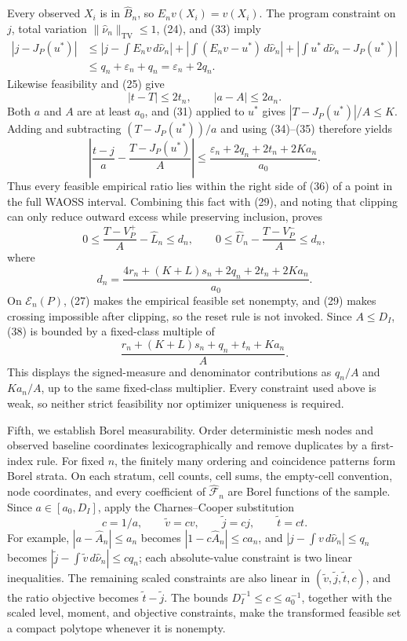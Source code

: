 Every observed \(X_i\) is in \(\widehat B_n\), so \(E_nv(X_i)=v(X_i)\). The program constraint on \(j\), total variation \(\|\widehat\nu_n\|_{\mathrm{TV}}\leq1\), (24), and (33) imply
\[
\begin{aligned}
 |j-J_P(u^*)|
 &\leq\left|j-\int E_nv\,d\widehat\nu_n\right|
 +\left|\int(E_nv-u^*)\,d\widehat\nu_n\right|
 +\left|\int u^*\,d\widehat\nu_n-J_P(u^*)\right|\\
 &\leq q_n+\varepsilon_n+q_n
 =\varepsilon_n+2q_n.                                           \tag{34}
\end{aligned}
\]
Likewise feasibility and (25) give
\[
 |t-T|\leq2t_n,
 \qquad |a-A|\leq2a_n.                                          \tag{35}
\]
Both \(a\) and \(A\) are at least \(a_0\), and (31) applied to \(u^*\) gives \(|T-J_P(u^*)|/A\leq K\). Adding and subtracting \((T-J_P(u^*))/a\) and using (34)--(35) therefore yields
\[
 \left|\frac{t-j}{a}-\frac{T-J_P(u^*)}{A}\right|
 \leq\frac{\varepsilon_n+2q_n+2t_n+2Ka_n}{a_0}.                  \tag{36}
\]
Thus every feasible empirical ratio lies within the right side of (36) of a point in the full WAOSS interval. Combining this fact with (29), and noting that clipping can only reduce outward excess while preserving inclusion, proves
\[
 0\leq\frac{T-V_P^+}{A}-\widehat L_n\leq d_n,
 \qquad
 0\leq\widehat U_n-\frac{T-V_P^-}{A}\leq d_n,                   \tag{37}
\]
where
\[
 d_n=\frac{4r_n+(K+L)s_n+2q_n+2t_n+2Ka_n}{a_0}.                  \tag{38}
\]
On \(\mathcal E_n(P)\), (27) makes the empirical feasible set nonempty, and (29) makes crossing impossible after clipping, so the reset rule is not invoked. Since \(A\leq D_I\), (38) is bounded by a fixed-class multiple of
\[
 \frac{r_n+(K+L)s_n+q_n+t_n+Ka_n}{A}.                            \tag{39}
\]
This displays the signed-measure and denominator contributions as \(q_n/A\) and \(Ka_n/A\), up to the same fixed-class multiplier. Every constraint used above is weak, so neither strict feasibility nor optimizer uniqueness is required.

Fifth, we establish Borel measurability. Order deterministic mesh nodes and observed baseline coordinates lexicographically and remove duplicates by a first-index rule. For fixed \(n\), the finitely many ordering and coincidence patterns form Borel strata. On each stratum, cell counts, cell sums, the empty-cell convention, node coordinates, and every coefficient of \(\widehat{\mathscr F}_n\) are Borel functions of the sample. Since \(a\in[a_0,D_I]\), apply the Charnes--Cooper substitution
\[
 c=1/a,
 \qquad \widetilde v=cv,
 \qquad \widetilde j=cj,
 \qquad \widetilde t=ct.
\]
For example, \(|a-\widehat A_n|\leq a_n\) becomes
\(
 |1-c\widehat A_n|\leq ca_n
\), and \(|j-\int v\,d\widehat\nu_n|\leq q_n\) becomes
\(
 |\widetilde j-\int\widetilde v\,d\widehat\nu_n|\leq cq_n
\); each absolute-value constraint is two linear inequalities. The remaining scaled constraints are also linear in \((\widetilde v,\widetilde j,\widetilde t,c)\), and the ratio objective becomes \(\widetilde t-\widetilde j\). The bounds \(D_I^{-1}\leq c\leq a_0^{-1}\), together with the scaled level, moment, and objective constraints, make the transformed feasible set a compact polytope whenever it is nonempty.

